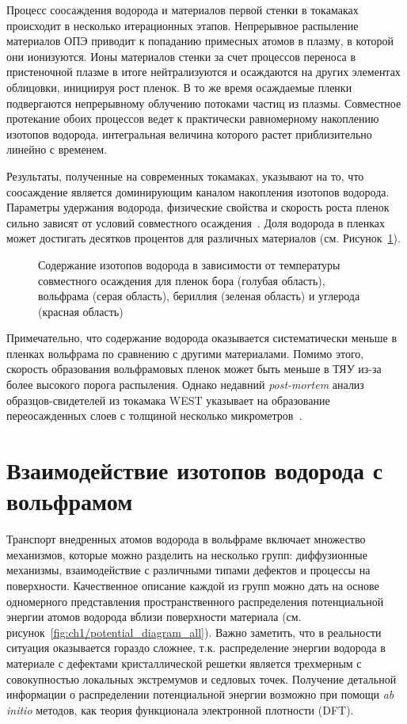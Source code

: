 Процесс соосаждения водорода и материалов первой стенки в токамаках происходит в несколько итерационных этапов. Непрерывное распыление материалов ОПЭ приводит к попаданию примесных атомов в плазму, в которой они ионизуются. Ионы материалов стенки за счет процессов переноса в пристеночной плазме в итоге нейтрализуются и осаждаются на других элементах облицовки, инициируя рост пленок. В то же время осаждаемые пленки подвергаются непрерывному облучению потоками частиц из плазмы. Совместное протекание обоих процессов ведет к практически равномерному накоплению изотопов водорода, интегральная величина которого растет приблизительно линейно с временем.

Результаты, полученные на современных токамаках, указывают на то, что соосаждение является доминирующим каналом накопления изотопов водорода. Параметры удержания водорода, физические свойства и скорость роста пленок сильно зависят от условий совместного осаждения~\cite{Gasparyan2019,Krat2020,Krat2025}. Доля водорода в пленках может достигать десятков процентов для различных материалов (см. Рисунок~\cref{fig:ch1/codeposition_review}).
\begin{figure}[ht]
    \caption{Содержание изотопов водорода в зависимости от температуры совместного осаждения для пленок бора (голубая область), вольфрама (серая область), бериллия (зеленая область) и углерода (красная область)~\cite{Pitts2025}}\label{fig:ch1/codeposition_review}
\end{figure}
Примечательно, что содержание водорода оказывается систематически меньше в пленках вольфрама по сравнению с другими материалами. Помимо этого, скорость образования вольфрамовых пленок может быть меньше в ТЯУ из-за более высокого порога распыления. Однако недавний \textit{post-mortem} анализ образцов-свидетелей из токамака WEST указывает на образование переосажденных слоев с толщиной несколько микрометров~\cite{Bucalossi2024}.

\section{Взаимодействие изотопов водорода с вольфрамом}\label{subsec:ch1/sec4}

Транспорт внедренных атомов водорода в вольфраме включает множество механизмов, которые можно разделить на несколько групп: диффузионные механизмы, взаимодействие с различными типами дефектов и процессы на поверхности. Качественное описание каждой из групп можно дать на основе одномерного представления пространственного распределения потенциальной энергии атомов водорода вблизи поверхности материала (см. рисунок~\cref{fig:ch1/potential_diagram_all}). Важно заметить, что в реальности ситуация оказывается гораздо сложнее, т.к. распределение энергии водорода в материале с дефектами кристаллической решетки является трехмерным с совокупностью локальных экстремумов и седловых точек. Получение детальной информации о распределении потенциальной энергии возможно при помощи \textit{ab initio} методов, как теория функционала электронной плотности (DFT).

